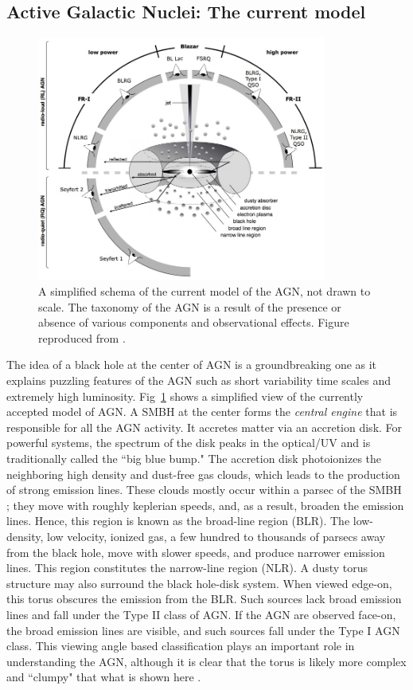 \subsection{Active Galactic Nuclei: The current model \label{sec:agn_current_model}}
\begin{figure}
        \centering
    \includegraphics[width=0.849\textwidth]{images/misc/agn_model.jpg}%
    \caption{A simplified schema of the current model of the AGN, not drawn to scale. The taxonomy of the AGN is a result of the presence or absence of various components and observational effects. Figure reproduced from \citet{beckmann2012agn}.    \label{fig:agn_model} }
\end{figure}
The idea of a black hole at the center of AGN is a groundbreaking one as it explains puzzling  features of the AGN such as short variability time scales and extremely high luminosity. Fig~\ref{fig:agn_model} shows a simplified view of the currently accepted model of AGN.  A SMBH at the center forms the \textit{central engine} that is responsible for all the AGN activity. It accretes matter via an accretion disk. For powerful systems, the spectrum of the disk peaks in the optical/UV and is traditionally called the ``big blue bump." The accretion disk photoionizes the neighboring high density and dust-free gas clouds, which leads to the production of strong  emission lines. These clouds mostly occur within a parsec of the SMBH \citep{peterson2006broad}; they move with roughly keplerian speeds, and, as a result,  broaden the emission lines. Hence, this region is known as the broad-line region (BLR). The low-density, low velocity, ionized gas, a few hundred to thousands of parsecs away from the black hole, move with slower speeds, and produce narrower emission lines. This region constitutes the narrow-line region (NLR). A dusty torus structure may also surround the black hole-disk system. When viewed edge-on, this torus obscures the emission from the BLR. Such sources lack broad emission lines and fall under the Type II class of AGN. If the AGN are observed face-on, the broad emission lines are visible, and such sources fall under the Type I AGN class. This viewing angle based classification plays an important role in understanding the AGN, although it is clear that the torus is likely more complex and ``clumpy" that what is shown here \citep[see][and references there in]{H_nig_2019}.
